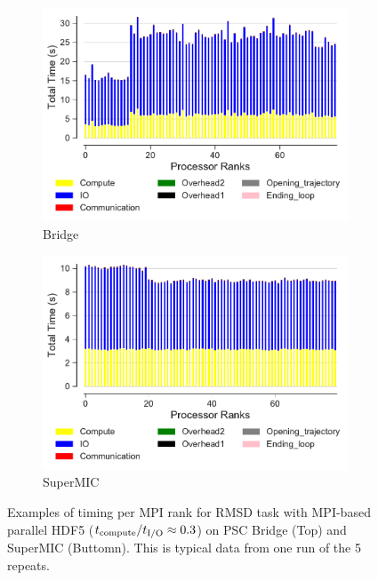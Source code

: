 \begin{figure}[ht!]
\centering
\begin{subfigure}{.6\textwidth}
  \includegraphics[width=\linewidth]{figures/Bridge-MPI-IO-BarPlot-rank-comparison_78_5.pdf}
  \caption{Bridge}
  \label{fig:hdf5-bridge}
\end{subfigure}
\bigskip
\begin{subfigure} {.6\textwidth}
  \includegraphics[width=\linewidth]{figures/SuperMIC-MPI-IO-BarPlot-rank-comparison_80_5.pdf}
  \caption{SuperMIC}
  \label{fig:hdf5-SuperMIC}
\end{subfigure}
%
\caption{Examples of timing per MPI rank for RMSD task with MPI-based parallel HDF5 (${t}_{\text{compute}}/{t}_{\text{I/O}} \approx 0.3$) on PSC Bridge (Top) and SuperMIC (Buttomn).
This is typical data from one run of the 5 repeats.}
\label{fig:MPIwithIO-clusters-rank}
\end{figure} 

